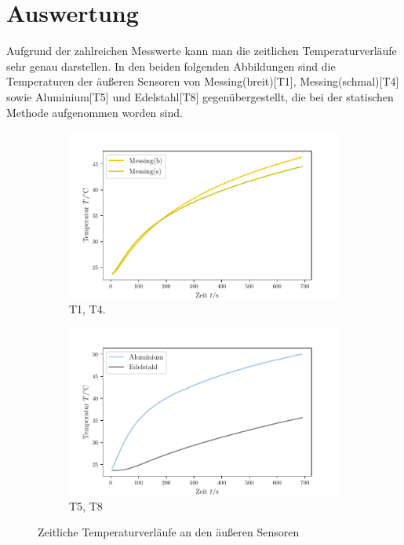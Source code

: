 \section{Auswertung}
\label{sec:Auswertung}
Aufgrund der zahlreichen Messwerte kann man die zeitlichen Temperaturverläufe sehr genau darstellen.
In den beiden folgenden Abbildungen sind die Temperaturen der äußeren Sensoren von 
Messing(breit)[T1], Messing(schmal)[T4] sowie Aluminium[T5] und Edelstahl[T8] gegenübergestellt, die bei der 
statischen Methode aufgenommen worden sind.
\begin{figure}
    \centering
    \begin{subfigure}{.5\textwidth}
        \centering
        \includegraphics[max width=1.1\linewidth]{plots/plot_t1_t4.pdf}
        \caption{T1, T4.}
        \label{fig:plot_t1_t4}
    \end{subfigure}%
    \begin{subfigure}{.5\textwidth}
        \centering
        \includegraphics[max width=1.1\linewidth]{plots/plot_t5_t8.pdf}
        \caption{T5, T8}
        \label{fig:plot_t5_t8}
    \end{subfigure}
    \caption{Zeitliche Temperaturverläufe an den äußeren Sensoren}
    \label{fig:tempDiff_t1t4t5t8}
\end{figure}
